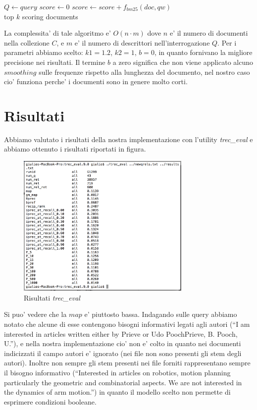 \documentclass[12pt]{article}
\begin{document}
\begin{algorithmic}
\State $Q \gets query$
    \State $score\gets 0$
        \State $score \gets score + f_{bm25}(doc, qw)$
    \EndFor
\EndFor\\
\Return top $k$ scoring documents
\end{algorithmic}

La complessita' di tale algoritmo e' $O(n \cdot m)$ dove $n$ e' il numero di documenti nella collezione $C$, e $m$ e' il numero di descrittori nell'interrogazione $Q$. Per i parametri abbiamo scelto: $k1=1.2$, $k2=1$, $b=0$, in quanto fornivano la migliore precisione nei risultati. Il termine $b$ a zero significa che non viene applicato alcuno $smoothing$ sulle frequenze rispetto alla lunghezza del documento, nel nostro caso cio' funziona perche' i documenti sono in genere molto corti.

\section{Risultati}
Abbiamo valutato i risultati della nostra implementazione con l'utility \textit{trec\_eval} e abbiamo ottenuto i risultati riportati in figura.
\begin{figure}[htbp]
\begin{center}
\includegraphics[width=0.75\textwidth]{myresult.png}
\caption{Risultati \textit{trec\_eval}}
\label{default}
\end{center}
\end{figure}

Si puo' vedere che la $map$ e' piuttosto bassa. Indagando sulle query abbiamo notato che alcune di esse contengono bisogni informativi legati agli autori (``I am interested in articles written either by Prieve or Udo PoochPrieve, B. Pooch, U.''), e nella nostra implementazione cio' non e' colto in quanto nei documenti indicizzati il campo autori e' ignorato (nei file non sono presenti gli stem degli autori). Inoltre non sempre gli stem presenti nei file forniti rappresentano sempre il bisogno informativo (``Interested in articles on robotics, motion planning particularly the geometric and combinatorial aspects. We are not interested in the dynamics of arm motion.'') in quanto il modello scelto non permette di esprimere condizioni booleane.



\end{document}
